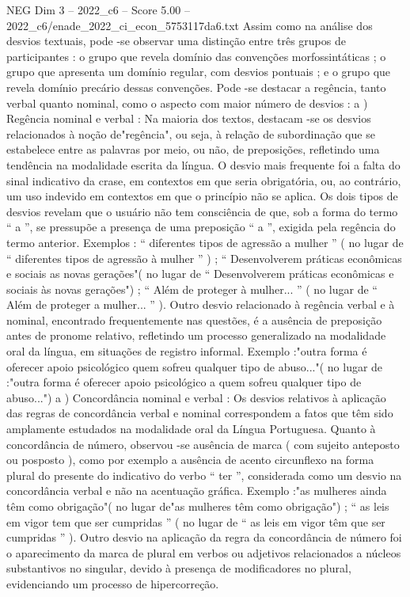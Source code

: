 \begin{textsample}{NEG Dim 3 – 2022\_c6 – Score 5.00 – 2022\_c6/enade\_2022\_ci\_econ\_5753117da6.txt}
Assim como na análise dos desvios textuais, pode -se observar uma distinção entre três grupos de participantes : o grupo que revela domínio das convenções morfossintáticas ; o grupo que apresenta um domínio regular, com desvios pontuais ; e o grupo que revela domínio precário dessas convenções.
Pode -se destacar a regência, tanto verbal quanto nominal, como o aspecto com maior número de desvios : a ) Regência nominal e verbal : Na maioria dos textos, destacam -se os desvios relacionados à noção de"regência", ou seja, à relação de subordinação que se estabelece entre as palavras por meio, ou não, de preposições, refletindo uma tendência na modalidade escrita da língua.
O desvio mais frequente foi a falta do sinal indicativo da crase, em contextos em que seria obrigatória, ou, ao contrário, um uso indevido em contextos em que o princípio não se aplica.
Os dois tipos de desvios revelam que o usuário não tem consciência de que, sob a forma do termo “ a ”, se pressupõe a presença de uma preposição “ a ”, exigida pela regência do termo anterior.
Exemplos : “ diferentes tipos de agressão a mulher ” ( no lugar de “ diferentes tipos de agressão à mulher ” ) ; “ Desenvolverem práticas econômicas e sociais as novas gerações"( no lugar de “ Desenvolverem práticas econômicas e sociais às novas gerações") ; “ Além de proteger à mulher... ” ( no lugar de “ Além de proteger a mulher... ” ).
Outro desvio relacionado à regência verbal e à nominal, encontrado frequentemente nas questões, é a ausência de preposição antes de pronome relativo, refletindo um processo generalizado na modalidade oral da língua, em situações de registro informal.
Exemplo :"outra forma é oferecer apoio psicológico quem sofreu qualquer tipo de abuso..."( no lugar de :"outra forma é oferecer apoio psicológico a quem sofreu qualquer tipo de abuso...") a ) Concordância nominal e verbal : Os desvios relativos à aplicação das regras de concordância verbal e nominal correspondem a fatos que têm sido amplamente estudados na modalidade oral da Língua Portuguesa.
Quanto à concordância de número, observou -se ausência de marca ( com sujeito anteposto ou posposto ), como por exemplo a ausência de acento circunflexo na forma plural do presente do indicativo do verbo “ ter ”, considerada como um desvio na concordância verbal e não na acentuação gráfica.
Exemplo :"as mulheres ainda têm como obrigação"( no lugar de"as mulheres têm como obrigação") ; “ as leis em vigor tem que ser cumpridas ” ( no lugar de “ as leis em vigor têm que ser cumpridas ” ).
Outro desvio na aplicação da regra da concordância de número foi o aparecimento da marca de plural em verbos ou adjetivos relacionados a núcleos substantivos no singular, devido à presença de modificadores no plural, evidenciando um processo de hipercorreção.

\end{textsample}
